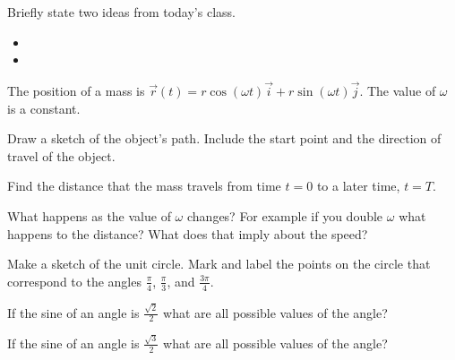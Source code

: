 \postClass

\begin{problem}
\item Briefly state two ideas from today's class.
  \begin{itemize}
  \item 
  \item 
  \end{itemize}
\item The position of a mass is
  $\vec{r}(t)=r\cos(\omega t)\vec{i}+r\sin(\omega t)\vec{j}$. The
  value of $\omega$ is a constant.
  \begin{subproblem}
  \item Draw a sketch of the object's path. Include the start point
    and the direction of travel of the object.  
    \vfill
    \vfill
  \item Find the distance that the mass travels from time $t=0$ to a
    later time, $t=T$.
    \vfill
  \item What happens as the value of $\omega$ changes? For example
    if you double $\omega$ what happens to the distance? What does
    that imply about the speed?
    \vfill
  \end{subproblem}
\end{problem}



\begin{problem}
\item Make a sketch of the unit circle. Mark and label the points on
  the circle that correspond to the angles $\frac{\pi}{4}$,
  $\frac{\pi}{3}$, and $\frac{3\pi}{4}$.
  \vfill
  \vfill
\item If the sine of an angle is $\frac{\sqrt{2}}{2}$ what are all
  possible values of the angle?
  \vfill
\item If the sine of an angle is $\frac{\sqrt{3}}{2}$ what are all
  possible values of the angle?
  \vfill
\end{problem}



